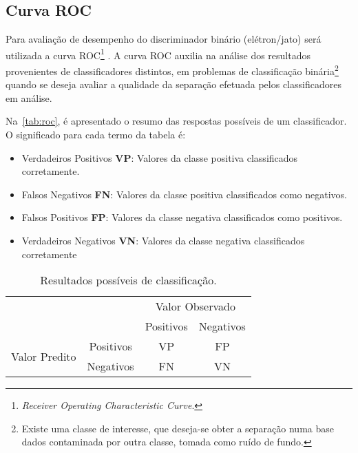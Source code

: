 \subsection{Curva ROC}

Para avaliação de desempenho do discriminador binário (elétron/jato) será utilizada a curva ROC\footnote{\textit{Receiver Operating Characteristic Curve}.} \cite{TomFawcett2006}. A curva ROC auxilia na análise dos resultados provenientes de classificadores distintos, em problemas de classificação binária\footnote{Existe uma classe de interesse, que deseja-se obter a separação numa base dados contaminada por outra classe, tomada como ruído de fundo.} quando se deseja avaliar a qualidade da separação efetuada pelos classificadores em análise.

Na~\autoref{tab:roc}, é apresentado o resumo das respostas possíveis de um classificador. O significado para cada termo da tabela é:

\begin{itemize}
	\item Verdadeiros Positivos \textbf{VP}: Valores da classe positiva classificados corretamente.
	\item Falsos Negativos \textbf{FN}: Valores da classe positiva classificados como negativos.
	\item Falsos Positivos \textbf{FP}: Valores da classe negativa classificados como positivos.
	\item Verdadeiros Negativos \textbf{VN}: Valores da classe negativa classificados corretamente
\end{itemize}

\begin{table}[H]
	\centering
	\setlength{\extrarowheight}{4pt} 
	\caption{Resultados possíveis de classificação.}\label{tab:roc}
	\begin{tabular}{*{4}{c}}\toprule
	            &	&\multicolumn{2}{c}{Valor Observado} \\\cmidrule(lr){3-4}
		        &   & Positivos & Negativos  \\ \cmidrule(lr){3-3}\cmidrule(lr){4-4}
\multirow{2}{1.5cm}{Valor Predito}& Positivos	&    VP     &     FP    \\ \cmidrule(lr){2-2}%
               	             	& Negativos	&    FN     &     VN    \\ \bottomrule
	\end{tabular}
\end{table}

